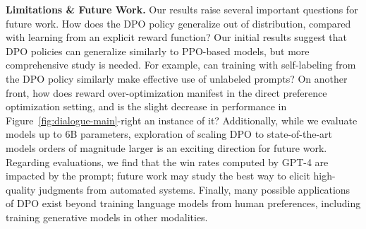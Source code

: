 \textbf{Limitations \& Future Work.} Our results raise several important questions for future work. How does the DPO policy generalize out of distribution, compared with learning from an explicit reward function? Our initial results suggest that DPO policies can generalize similarly to PPO-based models, but more comprehensive study is needed. For example, can training with self-labeling from the DPO policy similarly make effective use of unlabeled prompts? On another front, how does reward over-optimization manifest in the direct preference optimization setting, and is the slight decrease in performance in Figure~\ref{fig:dialogue-main}-right an instance of it? Additionally, while we evaluate models up to 6B parameters, exploration of scaling DPO to state-of-the-art models orders of magnitude larger is an exciting direction for future work. Regarding evaluations, we find that the win rates computed by GPT-4 are impacted by the prompt; future work may study the best way to elicit high-quality judgments from automated systems. Finally, many possible applications of DPO exist beyond training language models from human preferences, including training generative models in other modalities.


